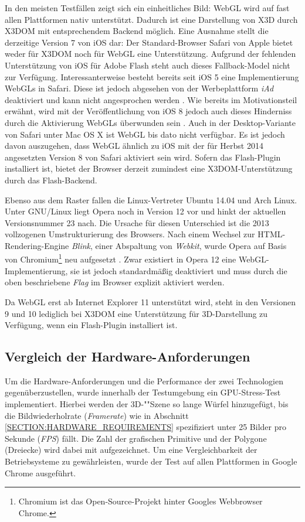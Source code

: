 In den meisten Testfällen zeigt sich ein einheitliches Bild: WebGL wird auf fast allen Plattformen nativ unterstützt. Dadurch ist eine Darstellung von X3D durch X3DOM mit entsprechendem Backend möglich. Eine Ausnahme stellt die derzeitige Version 7 von iOS dar: Der Standard-Browser Safari von Apple bietet weder für X3DOM noch für WebGL eine Unterstützung. Aufgrund der fehlenden Unterstützung von iOS für Adobe Flash steht auch dieses Fallback-Model nicht zur Verfügung.
Interessanterweise besteht bereits seit iOS 5 eine Implementierung WebGLs in Safari. Diese ist jedoch abgesehen von der Werbeplattform \emph{iAd} deaktiviert und kann nicht angesprochen werden \autocite{Benin:2012:THM:2338714.2338734}. Wie bereits im Motivationsteil erwähnt, wird mit der Veröffentlichung von iOS 8 jedoch auch dieses Hinderniss durch die Aktivierung WebGLs überwunden sein \autocite{APPLE_WWDC_2014_WEBGL}.
Auch in der Desktop-Variante von Safari unter Mac OS X ist WebGL bis dato nicht verfügbar. Es ist jedoch davon auszugehen, dass WebGL ähnlich zu iOS mit der für Herbst 2014 angesetzten Version 8 von Safari aktiviert sein wird. Sofern das Flash-Plugin installiert ist, bietet der Browser derzeit zumindest eine X3DOM-Unterstützung durch das Flash-Backend.

Ebenso aus dem Raster fallen die Linux-Vertreter Ubuntu 14.04 und Arch Linux. Unter GNU/Linux liegt Opera noch in Version 12 vor und hinkt der aktuellen Versionsnummer 23 nach. Die Ursache für diesen Unterschied ist die 2013 vollzogenen Umstrukturierung des Browsers. Nach einem Wechsel zur HTML-Rendering-Engine \emph{Blink}, einer Abspaltung von \emph{Webkit}, wurde Opera auf Basis von Chromium\footnote{Chromium ist das Open-Source-Projekt hinter Googles Webbrowser Chrome.} neu aufgesetzt \autocite{OPERA_SWITCHES_TO_WEBKIT}. Zwar existiert in Opera 12 eine WebGL-Implementierung, sie ist jedoch standardmäßig deaktiviert und muss durch die oben beschriebene \emph{Flag} im Browser explizit aktiviert werden.

Da WebGL erst ab Internet Explorer 11 unterstützt wird, steht in den Versionen 9 und 10 lediglich bei X3DOM eine Unterstützung für 3D-Darstellung zu Verfügung, wenn ein Flash-Plugin installiert ist.

\subsection{Vergleich der Hardware-Anforderungen}

Um die Hardware-Anforderungen und die Performance der zwei Technologien gegenüberzustellen, wurde innerhalb der Testumgebung ein GPU-Stress-Test implementiert. Hierbei werden der 3D-""Szene so lange Würfel hinzugefügt, bis die Bildwiederholrate (\emph{Framerate}) wie in Abschnitt \ref{SECTION:HARDWARE_REQUIREMENTS} spezifiziert unter 25 Bilder pro Sekunde (\emph{FPS}) fällt. Die Zahl der grafischen Primitive und der Polygone (Dreiecke) wird dabei mit aufgezeichnet. Um eine Vergleichbarkeit der Betriebsysteme zu gewährleisten, wurde der Test auf allen Plattformen in Google Chrome ausgeführt.

